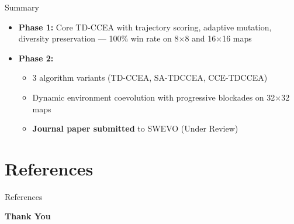 \documentclass[aspectratio=169, 11pt]{beamer}
\begin{document}
\begin{frame}{Summary}
\begin{itemize}
    \item \textbf{Phase 1:} Core TD-CCEA with trajectory scoring, adaptive mutation, diversity preservation --- 100\% win rate on 8$\times$8 and 16$\times$16 maps
    \item \textbf{Phase 2:}
    \begin{itemize}
        \item 3 algorithm variants (TD-CCEA, SA-TDCCEA, CCE-TDCCEA)
        \item Dynamic environment coevolution with progressive blockades on 32$\times$32 maps
       
    
        \item \textbf{Journal paper submitted} to SWEVO (Under Review)
    \end{itemize}

\end{itemize}
\end{frame}


\section{References}
\begin{frame}[allowframebreaks]{References}
    
     
\end{frame}

\begin{frame}
    \centering    
    {\Huge \textbf{\textcolor{amritaMaroon}{Thank You}}}
\end{frame}
\end{document}

